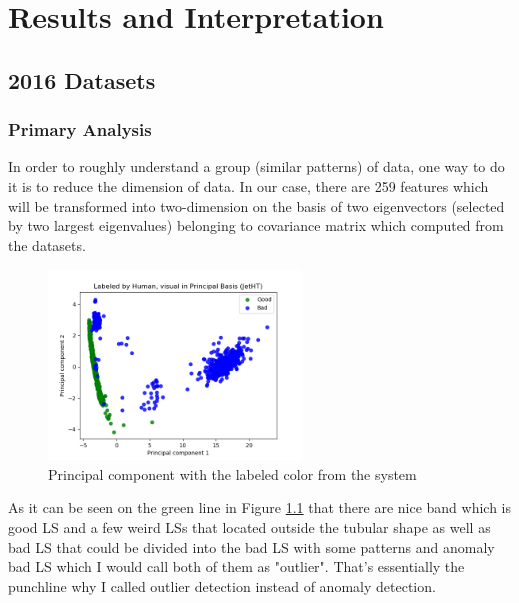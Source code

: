 \chapter{Results and Interpretation}

\section{2016 Datasets}

\subsection{Primary Analysis}
In order to roughly understand a group (similar patterns) of data, one way to do it is to reduce the dimension of data. In our case, there are 259 features which will be transformed into two-dimension on the basis of two eigenvectors (selected by two largest eigenvalues) belonging to covariance matrix which computed from the datasets.
\begin{figure}[h!]
    \centering
    \includegraphics[width=0.6\textwidth]{images/reco/2016/JetHT_label_2016.png}
    \caption{Principal component with the labeled color from the system}
    \label{fig:JetHT_label_2016}
\end{figure}

As it can be seen on the green line in Figure \ref{fig:JetHT_label_2016} that there are nice band which is good LS and a few weird LSs that located outside the tubular shape as well as bad LS that could be divided into the bad LS with some patterns and anomaly bad LS which I would call both of them as "outlier". That's essentially the punchline why I called outlier detection instead of anomaly detection.

